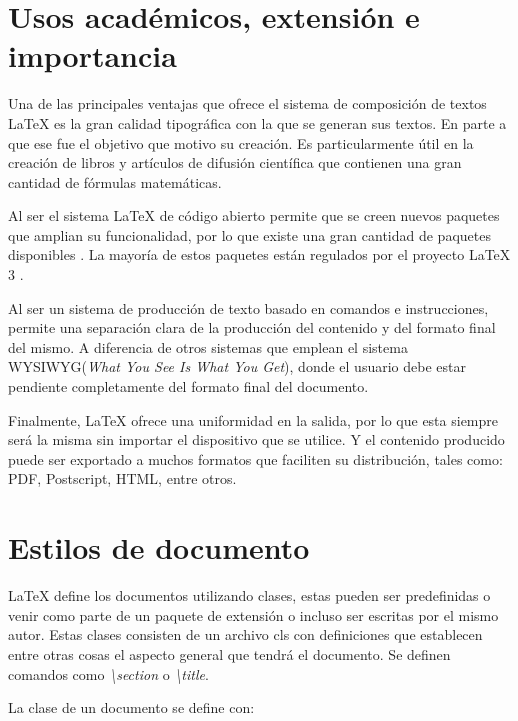 \documentclass[journal]{IEEEtran}
\begin{document}
\section{Usos académicos, extensión e importancia}
Una de las principales ventajas que ofrece el sistema de composición de textos \LaTeX\xspace  es la gran calidad tipográfica con la que se generan sus textos. En parte a que ese fue el objetivo que motivo su creación.
Es particularmente útil en la creación de libros y artículos de difusión científica que contienen una gran cantidad de fórmulas matemáticas.

Al ser el sistema \LaTeX\xspace  de código abierto permite que se creen nuevos paquetes que amplian su funcionalidad, por lo que
existe una gran cantidad de paquetes disponibles \cite{ctan}. La mayoría de estos paquetes están regulados por el proyecto \LaTeX\xspace 3 \cite{thelatex3}.

Al ser un sistema de producción de texto basado en comandos e instrucciones, permite una separación clara de la producción del contenido y del formato final del mismo.
A diferencia de otros sistemas que emplean el sistema WYSIWYG(\textit{What You See Is What You Get}), donde el usuario debe estar pendiente completamente del formato final del 
documento.

Finalmente, \LaTeX\xspace  ofrece una uniformidad en la salida, por lo que esta siempre será la misma sin importar el dispositivo que se utilice.
Y el contenido producido puede ser exportado a muchos formatos que faciliten su distribución, tales como: PDF, Postscript, HTML, entre otros.


\section{Estilos de documento}

\LaTeX\xspace  define los documentos utilizando clases, estas pueden ser predefinidas o venir como parte de un paquete de extensión o incluso ser escritas por el mismo autor.
Estas clases consisten de un archivo cls con definiciones que establecen entre otras cosas el aspecto general que tendrá el documento.
Se definen comandos como \emph{\textbackslash{}section} o \emph{\textbackslash{}title}.

La clase de un documento se define con:
\end{document}
